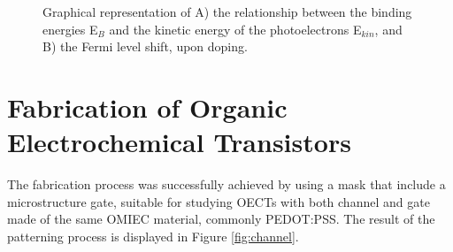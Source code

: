 \begin{figure}[ht]
	\centering
	\hspace{2em}
	\caption[Representation of the Fermi level shift upon doping]{ Graphical representation of A) the relationship between the binding energies E$_{B}$ and the kinetic energy of the photoelectrons E$_{kin}$, and B) the Fermi level shift, upon doping.} 
	\label{fig:ups}
\end{figure}


\section{Fabrication of Organic Electrochemical Transistors}
The fabrication process was successfully achieved by using a mask that include a microstructure gate, suitable for studying OECTs with both channel and gate made of the same OMIEC material, commonly PEDOT:PSS. The result of the patterning process is displayed in Figure \ref{fig:channel}. 

